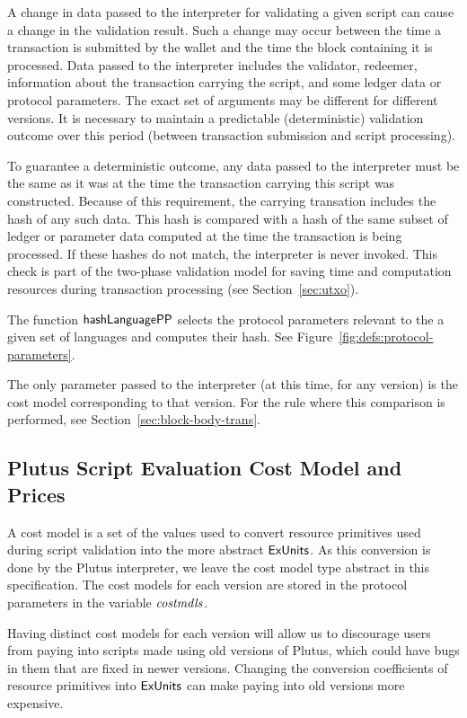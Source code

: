 A change in data passed to the interpreter for
validating a given script can cause a change in the validation result. Such
a change may occur between the time a transaction is submitted by the wallet
and the time the block containing it is processed. Data passed to the interpreter
includes the validator, redeemer, information about the transaction carrying
the script, and some ledger data or protocol parameters.
The exact set of arguments may be different for different versions.
It is necessary to maintain a predictable
(deterministic) validation outcome over this period (between transaction
submission and script processing).

To guarantee a deterministic outcome,
any data passed to the interpreter must be
the same as it was at the time the transaction carrying this script was
constructed.
Because of this requirement, the carrying transation includes the hash of any such data.
This hash is compared with
a hash of the same subset of ledger or parameter data computed at the time the transaction is being
processed. If these hashes do not match, the interpreter is never invoked.
This check is part of the two-phase validation model for saving time and computation
resources during transaction processing (see Section~\ref{sec:utxo}).

The function $\mathsf{hashLanguagePP}$ selects the protocol parameters relevant to
the a given set of languages and computes their hash.
See Figure~\ref{fig:defs:protocol-parameters}.

The only parameter passed to the interpreter (at this time, for any version) is the cost model
corresponding to that version. For the rule
where this comparison is performed, see Section~\ref{sec:block-body-trans}.

\subsection{Plutus Script Evaluation Cost Model and Prices}
\label{sec:cost-mod}

A cost model is a set of the values used to convert resource
primitives used during script validation into the
more abstract $\mathsf{ExUnits}$. As this conversion is done by the Plutus interpreter,
we leave the cost model type abstract in this specification.
The cost models for each version are stored in the protocol
parameters in the variable $\mathit{costmdls}$.

Having distinct cost models for each version will allow us to discourage users from
paying into scripts made using old versions of Plutus, which could have bugs
in them that are fixed in newer versions. Changing the conversion coefficients
of resource primitives into $\mathsf{ExUnits}$ can make paying into old versions
more expensive.

